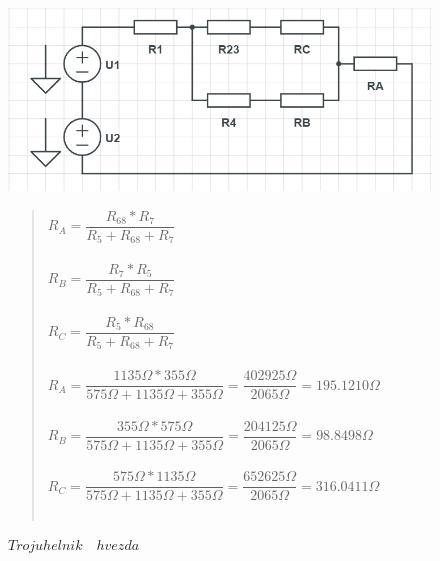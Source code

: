 \begin{figure}[H]
    \centering
    \includegraphics[scale=0.6]{pic1/u1o2.png}
    \caption{$Trojuhelnik \quad hvezda$}
    \label{fig:Trojuhelnik_Hvezda}
    \begin{quote}
    \centering
    $R_A =  \dfrac{R_{68} * R_7}{R_5 + R_{68} + R_7} $  \\~\\
    $R_B =  \dfrac{R_7 * R_5}{R_5 + R_{68} + R_7} $  \\~\\
    $R_C =  \dfrac{R_5 * R_{68}}{R_5 + R_{68} + R_7} $  \\~\\
    \medskip
    $R_A =  \dfrac{1135\Omega * 355\Omega}{575\Omega + 1135\Omega + 355\Omega} = \dfrac{402925\Omega}{2065\Omega} = 195.1210\Omega$ \\~\\
    $R_B =  \dfrac{355\Omega * 575\Omega}{575\Omega + 1135\Omega + 355\Omega} = \dfrac{204125\Omega}{2065\Omega} = 98.8498\Omega$ \\~\\
    $R_C =  \dfrac{575\Omega * 1135\Omega}{575\Omega + 1135\Omega + 355\Omega} = \dfrac{652625\Omega}{2065\Omega} = 316.0411\Omega$ \\~\\
    \end{quote}


\end{figure}
